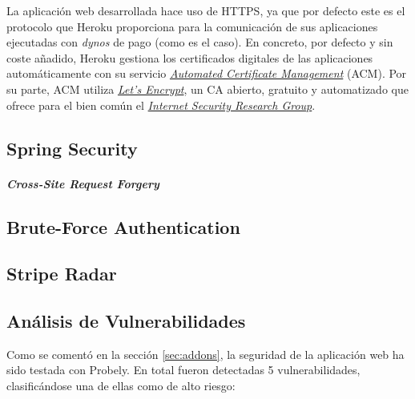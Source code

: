 \documentclass[a4paper]{article}
\begin{document}
	La aplicación web desarrollada hace uso de HTTPS, ya que por defecto este es el protocolo que Heroku proporciona para la comunicación de sus aplicaciones ejecutadas con \emph{dynos} de pago (como es el caso). En concreto, por defecto y sin coste añadido, Heroku gestiona los certificados digitales de las aplicaciones automáticamente con su servicio \href{https://devcenter.heroku.com/articles/automated-certificate-management}{\emph{Automated Certificate Management}} (ACM). Por su parte, ACM utiliza \href{https://letsencrypt.org/}{\emph{Let’s Encrypt}}, un CA abierto, gratuito y automatizado que ofrece para el bien común el \href{https://www.abetterinternet.org/}{\emph{Internet Security Research Group}}.
	
	\subsection{Spring Security} \label{sec:springsec}
	\subparagraph{Cross-Site Request Forgery}
	\subsection{Brute-Force Authentication}
	\subsection{Stripe Radar} \label{sec:striperadar}
	\subsection{Análisis de Vulnerabilidades} \label{sec:vulnerabilities}
	Como se comentó en la sección \ref{sec:addons}, la seguridad de la aplicación web ha sido testada con Probely. En total fueron detectadas 5 vulnerabilidades, clasificándose una de ellas como de alto riesgo:
	
\end{document}
